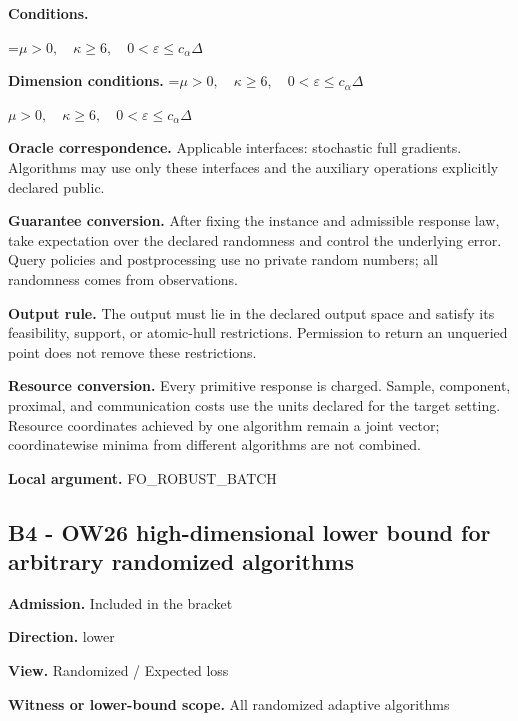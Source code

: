 \documentclass[10pt,a4paper]{article}
\newcommand{\AtlasMath}[1]{\par\begingroup\centering\setbox0=\hbox{$\displaystyle #1$}\ifdim\wd0>1.4\linewidth\typeout{ATLAS WIDE FORMULA: \the\wd0}\fi\ifdim\wd0>\linewidth\resizebox{\linewidth}{!}{\box0}\else\box0\fi\par\endgroup}
\newcommand{\AtlasInlineMath}[1]{\begingroup\setbox0=\hbox{$#1$}\ifdim\wd0>.4\linewidth\endgroup\AtlasMath{#1}\else\endgroup$#1$\fi}
\begin{document}
\textbf{Conditions.}
\AtlasMath{\mu>0,\quad\kappa\ge6,\quad0<\varepsilon\le c_\alpha\Delta}




\textbf{Dimension conditions.} \AtlasInlineMath{\mu>0,\quad\kappa\ge6,\quad0<\varepsilon\le c_\alpha\Delta}



\textbf{Oracle correspondence.} Applicable interfaces: stochastic full gradients. Algorithms may use only these interfaces and the auxiliary operations explicitly declared public.



\textbf{Guarantee conversion.} After fixing the instance and admissible response law, take expectation over the declared randomness and control the underlying error. Query policies and postprocessing use no private random numbers; all randomness comes from observations.



\textbf{Output rule.} The output must lie in the declared output space and satisfy its feasibility, support, or atomic-hull restrictions. Permission to return an unqueried point does not remove these restrictions.



\textbf{Resource conversion.} Every primitive response is charged. Sample, component, proximal, and communication costs use the units declared for the target setting. Resource coordinates achieved by one algorithm remain a joint vector; coordinatewise minima from different algorithms are not combined.



\textbf{Local argument.} FO\_ROBUST\_BATCH



\subsection{B4 - OW26 high-dimensional lower bound for arbitrary randomized algorithms}


\textbf{Admission.} Included in the bracket



\textbf{Direction.} lower



\textbf{View.} Randomized / Expected loss



\textbf{Witness or lower-bound scope.} All randomized adaptive algorithms
\end{document}
